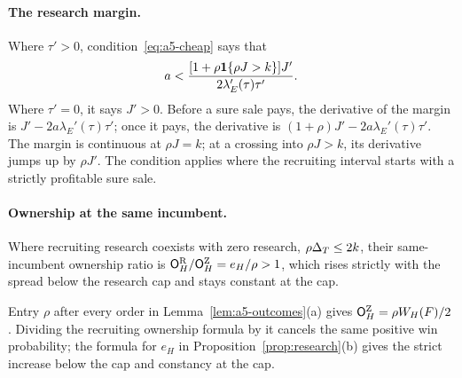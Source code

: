 \paragraph{The research margin.}
Where \(\tau'>0\), condition~\eqref{eq:a5-cheap} says that
\[
 a<\frac{[1+\rho\mathbf{1}\{\rho J>k\}]J'}{2\lambda_E'(\tau)\tau'}.
\]
Where \(\tau'=0\), it says \(J'>0\). Before a sure sale pays, the derivative of the margin is
\(J'-2a\lambda_E'(\tau)\tau'\); once it pays, the derivative is
\((1+\rho)J'-2a\lambda_E'(\tau)\tau'\). The margin is continuous at \(\rho J=k\); at a crossing into
\(\rho J>k\), its derivative jumps up by \(\rho J'\). The condition applies where the recruiting interval
starts with a strictly profitable sure sale.

\paragraph{Ownership at the same incumbent.}
Where recruiting research coexists with zero research, \(\rho\Delta_T\le2k\), their same-incumbent ownership ratio is
\(\mathsf{O}_H^{\rm R}/\mathsf{O}_H^{\rm Z}=e_H/\rho>1\), which rises strictly with the spread below the research cap and
stays constant at the cap.

Entry \(\rho\) after every order in Lemma~\ref{lem:a5-outcomes}(a) gives \(\mathsf{O}_H^{\rm Z}=\rho W_H(F)/2\).
Dividing the recruiting ownership formula by it cancels the same positive win probability; the formula for
\(e_H\) in Proposition~\ref{prop:research}(b) gives the strict increase below the cap and constancy at the cap.

